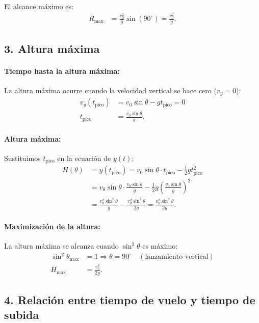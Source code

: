 \documentclass[12pt,a4paper]{article}
\begin{document}
El alcance máximo es:
\begin{align*}
R_{\max} &= \frac{v_0^2}{g} \sin(90^\circ) = \frac{v_0^2}{g}.
\end{align*}

\subsection*{3. Altura máxima}

\paragraph{Tiempo hasta la altura máxima:} La altura máxima ocurre cuando la velocidad vertical se hace cero ($v_y=0$):
\begin{align*}
v_y(t_{\text{pico}}) &= v_0 \sin\theta - g t_{\text{pico}} = 0 \\
t_{\text{pico}} &= \frac{v_0 \sin\theta}{g}.
\end{align*}

\paragraph{Altura máxima:} Sustituimos $t_{\text{pico}}$ en la ecuación de $y(t)$:
\begin{align*}
H(\theta) &= y(t_{\text{pico}}) = v_0 \sin\theta \cdot t_{\text{pico}} - \tfrac{1}{2} g t_{\text{pico}}^2 \\
&= v_0 \sin\theta \cdot \frac{v_0 \sin\theta}{g} - \tfrac{1}{2} g \left(\frac{v_0 \sin\theta}{g}\right)^2 \\
&= \frac{v_0^2 \sin^2\theta}{g} - \frac{v_0^2 \sin^2\theta}{2g} = \frac{v_0^2 \sin^2\theta}{2g}.
\end{align*}

\paragraph{Maximización de la altura:} La altura máxima se alcanza cuando $\sin^2\theta$ es máximo:
\begin{align*}
\sin^2\theta_{\text{max}} &= 1 \Rightarrow \theta = 90^\circ \quad (\text{lanzamiento vertical}) \\
H_{\max} &= \frac{v_0^2}{2g}.
\end{align*}

\subsection*{4. Relación entre tiempo de vuelo y tiempo de subida}
\end{document}

